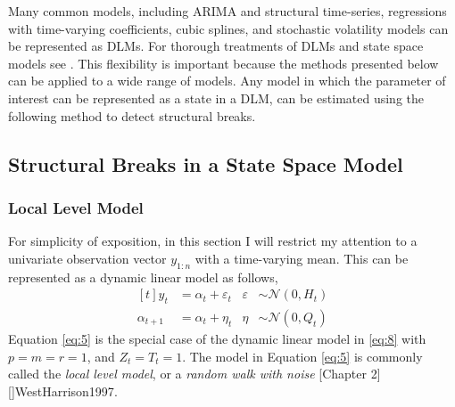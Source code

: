 \documentclass{article}
\newcommand{\dist}[1]{\mathcal{#1}}
\newcommand{\paren}[1]{\ensuremath{\left(#1\right)}}
\newcommand{\dnorm}[1]{\ensuremath{\dist{N}\paren{#1}}}
\begin{document}
Many common models, including ARIMA and structural time-series, regressions with time-varying coefficients, cubic splines, and stochastic volatility models can be represented as DLMs. 
For thorough treatments of DLMs and state space models see \textcites{WestHarrison1997}{DurbinKoopman2001}{PetrisPetroneEtAl2009}{CommandeurKoopman2007}.
This flexibility is important because the methods presented below can be applied to a wide range of models.
Any model in which the parameter of interest can be represented as a state in a DLM, can be estimated using the following method to detect structural breaks.


\subsection{Structural Breaks in a State Space Model}
\label{sec:struct-breaks-state}

\subsubsection{Local Level Model}
\label{sec:local-level-model}

For simplicity of exposition, in this section I will restrict my attention to a univariate observation vector $y_{1:n}$ with a time-varying mean.
This can be represented as a dynamic linear model as follows,
\begin{equation}
  \label{eq:5}
  \begin{aligned}[t]
    y_{t} &= \alpha_{t} + \varepsilon_{t} & \varepsilon & \sim \dnorm{0, H_{t}} \\
    \alpha_{t + 1} &= \alpha_{t} + \eta_{t} & \eta & \sim \dnorm{0, Q_{t}}
  \end{aligned}
\end{equation}
Equation \eqref{eq:5} is the special case of the dynamic linear model in \eqref{eq:8} with $p = m = r = 1$, and $Z_{t} = T_{t} = 1$.
The model in Equation \eqref{eq:5} is commonly called the \textit{local level model}, or a \textit{random walk with noise} \textcite[Chapter 2][]{DurbinKoopman2001}[Chapter 2][]{WestHarrison1997}.
\end{document}
